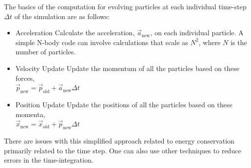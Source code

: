 \par 
The basics of the computation for evolving particles at each individual time-step $\Delta t$ of the simulation are as follows:
\begin{itemize}
	\item {\color{ForestGreen}Acceleration} Calculate the acceleration, $\vec{a}_{\textrm{new}}$, on each individual particle. A simple N-body code can involve calculations that scale as $N^2$, where $N$ is the number of particles.
	\item {\color{CornflowerBlue}Velocity Update} Update the momentum of all the particles based on these forces, \\$\vec{p}_{\textrm{new}} = \vec{p}_{\textrm{old}} + \vec{a}_{\textrm{new}}\Delta t$
	\item {\color{Purple}Position Update} Update the positions of all the particles based on these momenta, \\$\vec{x}_{\textrm{new}} = \vec{x}_{\textrm{old}} + \vec{p}_{\textrm{new}}\Delta t$
\end{itemize}
There are issues with this simplified approach related to energy conservation primarily related to the time step. One can also use other techniques to reduce errors in the time-integration. 


